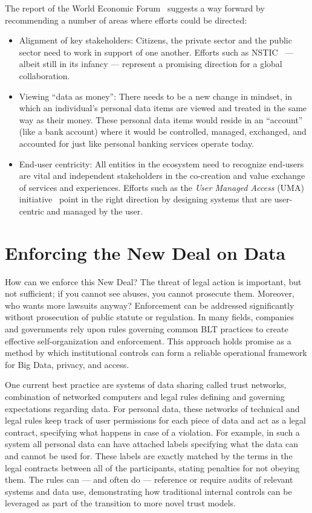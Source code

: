The report of the World Economic Forum~\cite{WEF2011} suggests a way forward by recommending
a number of areas where efforts could be directed:
\begin{itemize}
\item Alignment of key stakeholders:  
Citizens, the private sector and the public sector
need to work in support of one another.
Efforts such as NSTIC~\cite{NSTIC2011} --- albeit still in its infancy ---
represent a promising direction
for a global collaboration.


\item Viewing ``data as money'':
There needs to be a new change in mindset, in which
an individual's personal data items are viewed
and treated in the same way as their money.
These personal data items would reside in an ``account'' (like a bank account)
 where it would be controlled, managed, exchanged, and 
accounted for just like personal banking services operate today.


\item End-user centricity:  All entities in the ecosystem need to
recognize end-users are vital and 
independent stakeholders in the co-creation 
and value exchange of services and experiences.
Efforts such as the {\em User Managed Access} (UMA) initiative~\cite{UMAcore}
point in the right direction by designing systems that are
user-centric and managed by the user.

\end{itemize}

\section{Enforcing the New Deal on Data }

How can we enforce this New Deal?
The threat of legal action is important, but not sufficient; if you cannot see abuses, you cannot prosecute them.
Moreover, who wants more lawsuits anyway?
Enforcement can be addressed significantly without prosecution of public statute or regulation.
In many fields, companies and governments rely upon rules governing common BLT practices to create effective self-organization and enforcement.
This approach holds promise as a method by which institutional controls can form a reliable operational framework for Big Data, privacy, and access.

One current best practice are systems of data sharing called trust networks, combination of networked computers and legal rules defining and governing expectations regarding data.
For personal data, these networks of technical and legal rules keep track of user permissions for each piece of data and act as a legal contract, specifying what happens in case of a violation.
For example, in such a system all personal data can have attached labels specifying what the data can and cannot be used for.
These labels are exactly matched by the terms in the legal contracts between all of the participants, stating penalties for not obeying them.
The rules can --- and often do --- reference or require audits of relevant systems and data use, demonstrating how traditional internal controls can be leveraged as part of the transition to more novel trust models.

